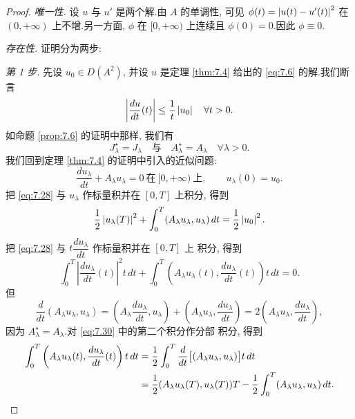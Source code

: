 \begin{proof}
\emph{唯一性.} 设 $u$ 与 $u'$ 是两个解.由 $A$ 的单调性, 可见
$\phi(t)=\left|u(t)-u'(t)\right|^2$ 在 $(0,+\infty)$ 上不增.另一方面, $\phi$ 在
$[0,+\infty)$ 上连续且 $\phi(0)=0$.因此 $\phi\equiv0$.

\emph{存在性.} 证明分为两步:

\emph{第 1 步.} 先设 $u_0\in D(A^2)$, 并设 $u$ 是定理  \ref{thm:7.4} 给出的
\eqref{eq:7.6} 的解.我们断言
\begin{equation}
\left|\frac{du}{dt}(t)\right|\le\frac1t\left|u_0\right|\quad\forall t>0.
\label{eq:7.27}
\end{equation}
如命题  \ref{prop:7.6} 的证明中那样, 我们有
\begin{equation*}
J_\lambda^\star=J_\lambda\quad\text{与}\quad A_\lambda^\star=A_\lambda
\quad\forall\lambda>0.
\end{equation*}
我们回到定理  \ref{thm:7.4} 的证明中引入的近似问题:
\begin{equation}
\frac{du_\lambda}{dt}+A_\lambda u_\lambda=0\ \text{在}\ [0,+\infty)\ \text{上},
\qquad u_\lambda(0)=u_0.
\label{eq:7.28}
\end{equation}
把 \eqref{eq:7.28} 与 $u_\lambda$ 作标量积并在 $[0,T]$ 上积分, 得到
\begin{equation}
\frac12\left|u_\lambda(T)\right|^2+\int_0^T(A_\lambda u_\lambda,u_\lambda)\,dt
=\frac12\left|u_0\right|^2.
\label{eq:7.29}
\end{equation}
把 \eqref{eq:7.28} 与 $t\dfrac{du_\lambda}{dt}$ 作标量积并在 $[0,T]$ 上
积分, 得到
\begin{equation}
\int_0^T\left|\frac{du_\lambda}{dt}(t)\right|^2t\,dt
+\int_0^T\left(A_\lambda u_\lambda(t),
\frac{du_\lambda}{dt}(t)\right)t\,dt=0.
\label{eq:7.30}
\end{equation}
但
\begin{equation*}
\frac{d}{dt}(A_\lambda u_\lambda,u_\lambda)
=\left(A_\lambda\frac{du_\lambda}{dt},u_\lambda\right)
+\left(A_\lambda u_\lambda,\frac{du_\lambda}{dt}\right)
=2\left(A_\lambda u_\lambda,\frac{du_\lambda}{dt}\right),
\end{equation*}
因为 $A_\lambda^\star=A_\lambda$.对 \eqref{eq:7.30} 中的第二个积分作分部
积分, 得到
\begin{align}
\int_0^T\left(A_\lambda u_\lambda(t),
\frac{du_\lambda}{dt}(t)\right)t\,dt
&=\frac12\int_0^T\frac{d}{dt}\bigl[(A_\lambda u_\lambda,u_\lambda)\bigr]t\,dt
\notag\\
&=\frac12(A_\lambda u_\lambda(T),u_\lambda(T))T
-\frac12\int_0^T(A_\lambda u_\lambda,u_\lambda)\,dt.
\label{eq:7.31}

\end{align}
\end{proof}
